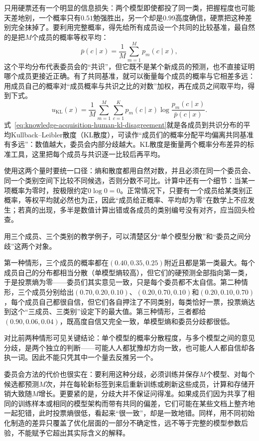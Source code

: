 只用硬票还有一个明显的信息损失：两个模型即使都投了同一类，把握程度也可能天差地别，一个概率只有$0.51$勉强胜出，另一个却是$0.99$高度确信，硬票把这种差别完全抹掉了。要利用完整概率，得先给所有成员设一个共同的比较基准，最自然的是把$M$个成员的概率等权平均：
\[
  \bar p(c\mid x)
  =\frac{1}{M}\sum_{m=1}^{M}p_m(c\mid x),
\]
这个平均分布代表委员会的“共识”，但它既不是某个新成员的预测，也不直接证明哪个成员更接近正确。有了共同基准，就可以衡量每个成员的概率与它相差多远：用成员自己的概率对“成员概率与共识之比的对数”加权，再在成员之间取平均，得到下式。
\begin{equation}
  u_{\mathrm{KL}}(x)
  =\frac{1}{M}\sum_{m=1}^{M}
    \sum_{c=1}^{K}p_m(c\mid x)
    \log\frac{p_m(c\mid x)}{\bar p(c\mid x)}.
  \label{eq:knowledge-acquisition-human-kl-disagreement}
\end{equation}
式~\eqref{eq:knowledge-acquisition-human-kl-disagreement}就是各成员到共识分布的平均Kullback--Leibler散度（KL散度），可读作“成员们的概率分配平均偏离共同基准有多远”：数值越大，委员会内部分歧越大。KL散度是衡量两个概率分布差异的标准工具，这里把每个成员与共识逐一比较后再平均。

使用这两个量时要统一口径：熵和散度都用自然对数，并且必须在同一个委员会、同一个类别空间下比较不同候选，否则分数不可比。计算中还有一个细节：当某一项概率为零时，按极限约定$0\log0=0$。正常情况下，只要有一个成员给某类别正概率，等权平均就必然也为正，因此“成员给正概率、平均却为零”在数学上不应发生；若真的出现，多半是数值计算出错或各成员的类别编号没有对齐，应当回头检查。

用三个成员、三个类别的教学例子，可以清楚区分“单个模型分散”和“委员之间分歧”这两个对象。

第一种情形，三个成员的概率都在$(0.40,0.35,0.25)$附近且都是第一类最大。每个成员自己的分布都相当分散（单模型熵较高），但它们的硬预测全部指向第一类，于是投票熵为零——委员们其实意见一致，只是每个委员都不太自信。第二种情形，三个成员分别给出$(0.70,0.20,0.10)$、$(0.20,0.70,0.10)$和$(0.20,0.10,0.70)$，每个成员自己都很自信，但它们各自押注了不同类别，每类恰好一票，投票熵达到这个“三成员、三类别”设定下的最大值。第三种情形，三者都给$(0.90,0.06,0.04)$，既高度自信又完全一致，单模型熵和委员分歧都很低。

对比前两种情形可见关键结论：单个模型的概率分散程度，与多个模型之间的意见分歧，是两个独立的判断——可能人人都犹豫却方向一致，也可能人人都自信却各执一词。因此不能只凭其中一个量去反推另一个。

委员会方法的代价也很实在：要利用这种分歧，必须训练并保存$M$个模型、对每个候选都预测$M$次，并在每轮新标签到来后重新训练或刷新这些成员，计算和存储开销大致随$M$增长。更要紧的是，分歧大并不保证问得准。如果成员们因为共享了相同的训练样本或相同的模型架构而带有共同的偏差，它们可能在某些文档上整齐地一起犯错，此时投票熵很低，看起来“很一致”，却是一致地错。同样，用不同初始化制造的差异只覆盖了优化层面的一部分不确定性，远不等于完整的模型参数后验，不能赋予它超出其实际含义的解释。

